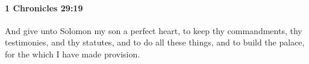 
		\paragraph{1 Chronicles 29:19} %
			\label{1CHRONICLES-29-19}

			And give unto Solomon my son a perfect heart, to keep thy commandments, thy testimonies, and thy statutes, and to do all these things, and to build the palace, for the which I have made provision.


